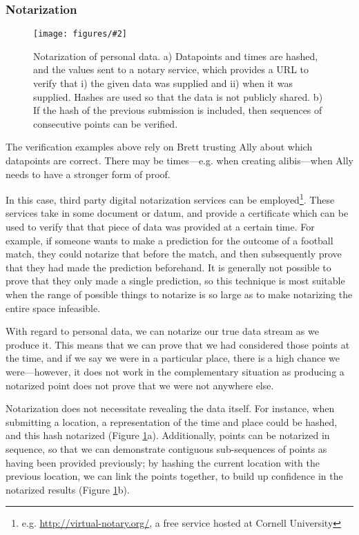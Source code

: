 \documentclass{IOS-Book-Article}     %
\newcommand{\fig}[3][0.9]{
\begin{figure}[tp]
\begin{center}
\texttt{[image: figures/\#2]}
\caption{#3}
\label{fig:#2}
\end{center}
\end{figure}
}
\begin{document}
\subsubsection{Notarization}
\fig{Notarization}{Notarization of personal data. a) Datapoints and times are
hashed, and the values sent to a notary service, which provides a URL to verify
that i) the given data was supplied and ii) when it was supplied. Hashes are
used so that the data is not publicly shared. b) If the hash of the previous
submission is included, then sequences of consecutive points can be verified.}

The verification examples above rely on Brett trusting Ally about which
datapoints are correct. There may be times---e.g. when creating alibis---when
Ally needs to have a stronger form of proof.

In this case, third party digital notarization services can be
employed\footnote{e.g.
\url{http://virtual-notary.org/}, a free service hosted at Cornell University}.
These services take in some document or datum, and provide a certificate which
can be used to verify that that piece of data was provided at a certain time. 
For example, if someone wants to make a prediction
for the outcome of a football match, they could notarize that before the match,
and then subsequently prove that they had made the prediction beforehand. It is
generally not possible to prove that they only made a single prediction, so this technique is most suitable when the range of possible things to notarize
is so large as to make notarizing the entire space infeasible.

With regard to personal data, we can notarize our true data stream as we produce
it. This means that we can prove that we had considered those points at the
time, and if we say we were in a particular place, there is a high chance we
were---however, it does not work in the complementary situation as producing a
notarized point does not prove that we were not anywhere else.


Notarization does not necessitate revealing the data itself. For instance,
when submitting a location, a representation of the time and place could be
hashed, and this hash notarized (Figure \ref{fig:Notarization}a). Additionally,
points can be notarized in sequence, so that we can demonstrate contiguous sub-sequences 
of points as having been provided previously; by
hashing the current location with the previous location, we can link the points
together, to build up confidence in the notarized results (Figure
\ref{fig:Notarization}b).
\end{document}
